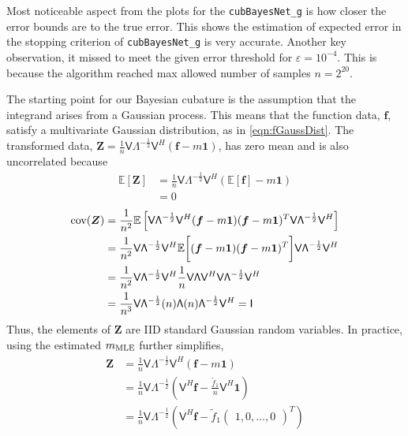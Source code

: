 \documentclass{iitthesis}          %
\newcommand{\bm}[1]{\boldsymbol{#1}}
\newcommand{\Ex}{\mathbb{E}}
\newcommand{\vf}{\bm{f}}
\newcommand{\vZ}{\bm{Z}}
\newcommand{\vone}{\bm{1}}
\newcommand{\cov}{{\textup{cov}}}
\newcommand{\mLambda}{\mathsf{\Lambda}}
\newcommand{\mV}{\mathsf{V}}
\newcommand{\MLE}{\textup{MLE}}
\newcommand{\code}[1]{\texttt{#1}}
\begin{document}
{{{{{{Most noticeable aspect from the plots for the \code{cubBayesNet\_g} is how closer the error bounds are to the true error. 
This shows the estimation of expected error in the stopping criterion of \code{cubBayesNet\_g} is very accurate.
Another key observation, it missed to meet the given error threshold for $\varepsilon=10^{-4}$. This is because the algorithm reached max allowed number of samples $n=2^{20}$.














\iffalse


The starting point for our Bayesian cubature is the assumption that the integrand arises from a Gaussian process. This means that the function data, $\vf$, satisfy a multivariate Gaussian distribution, as in \eqref{eqn:fGaussDist}.  The transformed data, $\vZ = \frac 1n \mV \mLambda^{-\frac 12} \mV^H(\vf - m \vone)$, has zero mean and is also uncorrelated because
\begin{align*}
\Ex\left[\vZ \right] &= 
\frac 1n \mV \mLambda^{-\frac 12} \mV^H(\Ex\left[\vf\right] - m \vone) 
\\
& = 0
\end{align*}
\begin{align*}
\cov (\vZ) 
&= \frac {1}{n^2} \Ex\left[  
\mV \mLambda^{-\frac 12} \mV^H (\vf - m \vone)
(\vf - m \vone)^T \mV \mLambda^{-\frac 12} \mV^H
\right]
\\
&=
\frac {1}{n^2} \mV \mLambda^{-\frac 12} \mV^H 
\Ex \biggl[ (\vf - m \vone)
(\vf - m \vone)^T \biggr] \mV \mLambda^{-\frac 12} \mV^H
\\ %
&=
\frac{1}{n^2} \mV \mLambda^{-\frac 12} \mV^H 
\frac 1n \mV \mLambda \mV^H \mV \mLambda^{-\frac 12} \mV^H
\\
&=
\frac{1}{n^3} \mV \mLambda^{-\frac 12} (n) \mLambda (n) \mLambda^{-\frac 12} \mV^H
= \mathsf{I}
\end{align*}
Thus, the elements of $\vZ$ are IID standard Gaussian random variables.  
In practice, using the estimated $m_\MLE$ further simplifies, 
\begin{align*}
\vZ &= \frac 1n \mV \mLambda^{-\frac 12} \mV^H(\vf - m \vone) \\
 &= \frac 1n \mV \mLambda^{-\frac 12} (\mV^H \vf - \frac{\tilde{f}_1}{n} \mV^H \vone) 
\\
 &= \frac 1n \mV \mLambda^{-\frac 12} \left(\mV^H \vf - \tilde{f}_1 \begin{pmatrix}1, 0, \hdots, 0 \end{pmatrix}^T \right) 
\end{align*}

}}}}}}
\end{document}
